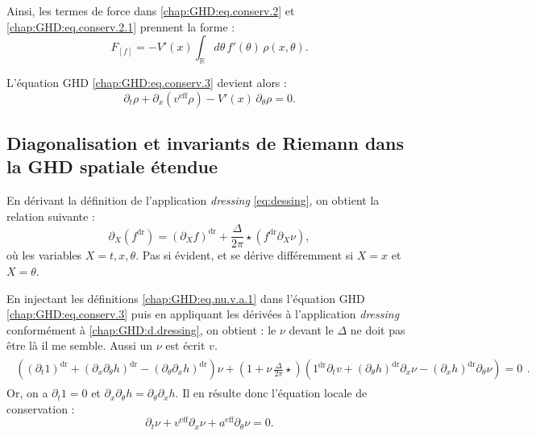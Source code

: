 Ainsi, les termes de force dans \eqref{chap:GHD:eq.conserv.2} et \eqref{chap:GHD:eq.conserv.2.1} prennent la forme :
\begin{equation}
	F_{[f]} = -V'(x) \int_{\mathbb{R}} d\theta \, f'(\theta) \, \rho(x, \theta).
\end{equation}

L’équation GHD \eqref{chap:GHD:eq.conserv.3} devient alors :
\begin{equation}\label{chap:GHD:eq.conserv.3.1}
	\partial_t \rho + \partial_x\!\left(v^{\mathrm{eff}} \rho\right) - V'(x) \, \partial_\theta \rho = 0.
\end{equation}


\subsection{Diagonalisation et invariants de Riemann dans la GHD spatiale étendue}

En dérivant la définition de l'application \emph{dressing} \eqref{eq:dessing}, on obtient la relation suivante :
\begin{equation}\label{chap:GHD:d.dressing}
	\partial_X(f^{\mathrm{dr}}) = \left (\partial_X f \right )^{\mathrm{dr}} + \frac{\Delta}{2\pi} \star ( f^{\mathrm{dr}} \partial_X \nu ), 	
\end{equation}
où les variables \(X = t, x, \theta\).
{\color{blue} Pas si évident, et se dérive différemment si $X=x$ et $X=\theta$.}
\medskip

En injectant les définitions \eqref{chap:GHD:eq.nu.v.a.1} dans l'équation GHD \eqref{chap:GHD:eq.conserv.3} puis en appliquant les dérivées à l'application \emph{dressing} conformément à \eqref{chap:GHD:d.dressing}, on obtient :
{\color{blue} le $\nu$ devant le $\Delta$ ne doit pas être là il me semble. Aussi un $\nu$ est écrit $v$.}
\begin{eqnarray}
	\begin{array}{c}\left ( \left(\partial_t 1 \right)^{\mathrm{dr}} + \left(\partial_x  \partial_\theta h  \right)^{\mathrm{dr}} - \left(\partial_\theta  \partial_x h  \right)^{\mathrm{dr}} \right ) \nu + \left ( 1 + \nu \,  \frac{\Delta}{2 \pi } \star  \right ) \left ( 1^{\mathrm{dr}} \partial_t v +  \left ( \partial_\theta h \right )^{\mathrm{dr}} \partial_x \nu -  \left ( \partial_x h \right )^{\mathrm{dr}} \partial_\theta \nu\right ) = 0  \end{array}. 
\end{eqnarray}
Or, on a \(\partial_t 1 = 0\) et \(\partial_x \partial_\theta h = \partial_\theta \partial_x h\). Il en résulte donc l'équation locale de conservation :  
\begin{equation}\label{chap:GHD:eq.nu.1}
	\partial_t \nu + v^{\mathrm{eff}}\partial_x \nu
	+ a^{\mathrm{eff}} \partial_\theta \nu = 0.
\end{equation}  


